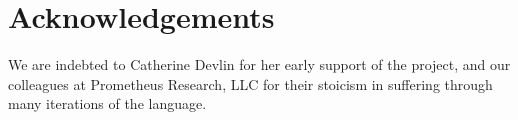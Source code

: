 
\section{Acknowledgements}

We are indebted to Catherine Devlin for her early support of the project, and
our colleagues at Prometheus Research, LLC for their stoicism in suffering
through many iterations of the language.

